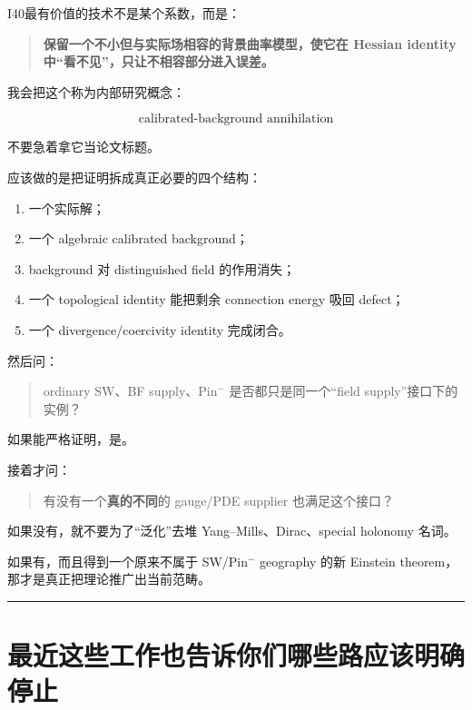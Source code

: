 \documentclass[
  10pt,
]{article}
\providecommand{\tightlist}{%
  \setlength{\itemsep}{0pt}\setlength{\parskip}{0pt}}
\begin{document}
I40最有价值的技术不是某个系数，而是：

\begin{quote}
\textbf{保留一个不小但与实际场相容的背景曲率模型，使它在 Hessian
identity 中``看不见''，只让不相容部分进入误差。}
\end{quote}

我会把这个称为内部研究概念：

\[
\boxed{\text{calibrated-background annihilation}}
\]

不要急着拿它当论文标题。

应该做的是把证明拆成真正必要的四个结构：

\begin{enumerate}
\def\labelenumi{\arabic{enumi}.}
\tightlist
\item
  一个实际解；
\item
  一个 algebraic calibrated background；
\item
  background 对 distinguished field 的作用消失；
\item
  一个 topological identity 能把剩余 connection energy 吸回 defect；
\item
  一个 divergence/coercivity identity 完成闭合。
\end{enumerate}

然后问：

\begin{quote}
ordinary SW、BF supply、Pin\(^{-}\) 是否都只是同一个``field
supply''接口下的实例？
\end{quote}

如果能严格证明，是。

接着才问：

\begin{quote}
有没有一个\textbf{真的不同}的 gauge/PDE supplier 也满足这个接口？
\end{quote}

如果没有，就不要为了``泛化''去堆 Yang--Mills、Dirac、special holonomy
名词。

如果有，而且得到一个原来不属于 SW/Pin\(^{-}\) geography 的新 Einstein
theorem，那才是真正把理论推广出当前范畴。

\begin{center}\rule{0.5\linewidth}{0.5pt}\end{center}

\hypertarget{ux6700ux8fd1ux8fd9ux4e9bux5de5ux4f5cux4e5fux544aux8bc9ux4f60ux4eecux54eaux4e9bux8defux5e94ux8be5ux660eux786eux505cux6b62}{%
\section{最近这些工作也告诉你们哪些路应该明确停止}\label{ux6700ux8fd1ux8fd9ux4e9bux5de5ux4f5cux4e5fux544aux8bc9ux4f60ux4eecux54eaux4e9bux8defux5e94ux8be5ux660eux786eux505cux6b62}}
\end{document}
